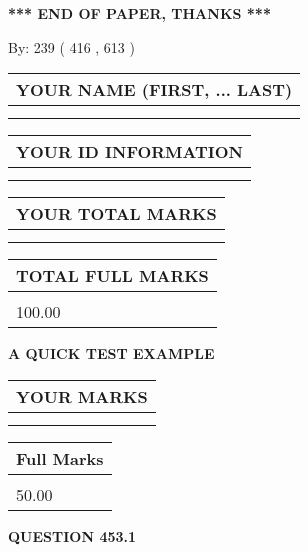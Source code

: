 \documentclass[12pt]{article}
\begin{document}
\vspace{1.0in} 
{\textbf{\large{ *** END OF PAPER, THANKS *** }}} 
   
   
\hspace{1.0in} By: 
 239 ( 416 ,  613 )
   
   
   
   
\newpage 
\setcounter{page}{ 
   453001 } 
   
   
   
   
\noindent\begin{tabular}{|l|}
\hline
YOUR NAME (FIRST, ... LAST)  \\
\hline
 \\ 
 \\ 
\hline
\end{tabular}
\hspace{0.05in} \begin{tabular}{|l|}
\hline
 YOUR   ID   INFORMATION  \\
\hline
 \\ 
 \\ 
\hline
\end{tabular}
   
   
\vspace{0.2in}\noindent\begin{tabular}{|l|}
\hline
YOUR TOTAL MARKS  \\
\hline
 \\ 
 \\ 
\hline
\end{tabular}
\hspace{0.05in} \begin{tabular}{|l|}
\hline
TOTAL FULL MARKS  \\
\hline
 \\ 
100.00 \\
\hline
\end{tabular}
   
   
 \vspace{0.2in}
{\LARGE {\textbf{ A QUICK TEST EXAMPLE}}}
   
   
  
\vspace{0.2in}
  
\noindent\begin{tabular}{|l|}
\hline
 YOUR MARKS  \\
\hline
 \\ 
 \\ 
\hline
\end{tabular}
\hspace{0.05in} \begin{tabular}{|l|}
\hline
 Full Marks  \\
\hline
 \\ 
50.00 \\
\hline
\end{tabular}
{\textbf{\Large{QUESTION
453.1 
}}}
  
\end{document}
